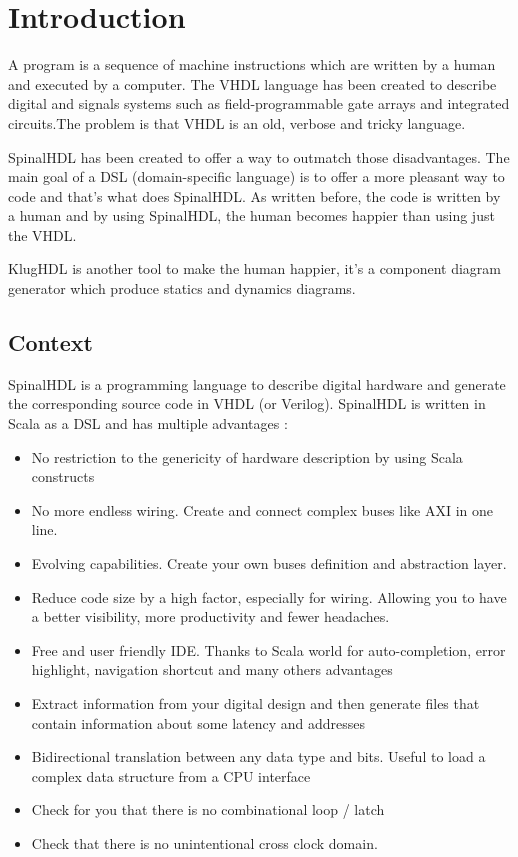 \chapter{Introduction}
\label{cha:Introduction}

A program is a sequence of machine instructions which are written by a
human and executed by a computer. The VHDL language has been created to describe
digital and signals systems such as field-programmable gate arrays and
integrated circuits\cite{wiki-vhdl}.The problem is that VHDL is an old, verbose
and tricky language.

SpinalHDL has been created to offer a way to outmatch those disadvantages. The
main goal of a DSL (domain-specific language) is to offer a more pleasant way to
code and that's what does SpinalHDL. As written before, the code is written by a
human and by using SpinalHDL, the human becomes happier than using just the VHDL.

KlugHDL is another tool to make the human happier, it's a component diagram
generator which produce statics and dynamics diagrams.

\section{Context}
\label{sec:Context}

SpinalHDL is a programming language to describe digital hardware and generate
the corresponding source code in VHDL (or Verilog). SpinalHDL is written in Scala as a DSL
and has multiple advantages\cite{github-spinalhdl} :
\begin{itemize}
    \item No restriction to the genericity of hardware description by using
      Scala constructs
    \item No more endless wiring. Create and connect complex buses like AXI in one line.
    \item Evolving capabilities. Create your own buses definition and abstraction layer.
    \item Reduce code size by a high factor, especially for wiring. Allowing you
      to have a better visibility, more productivity and fewer headaches.
    \item Free and user friendly IDE. Thanks to Scala world for auto-completion,
      error highlight, navigation shortcut and many others advantages
    \item Extract information from your digital design and then generate files
      that contain information about some latency and addresses
    \item Bidirectional translation between any data type and bits. Useful to
      load a complex data structure from a CPU interface
    \item Check for you that there is no combinational loop / latch
    \item Check that there is no unintentional cross clock domain.
\end{itemize}

